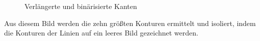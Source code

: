 \begin{figure}[h!]
    \hfill
    \caption{Verlängerte und binärisierte Kanten}
\end{figure}

Aus diesem Bild werden die zehn größten Konturen ermittelt und isoliert, indem die Konturen der Linien auf ein leeres Bild gezeichnet werden.

